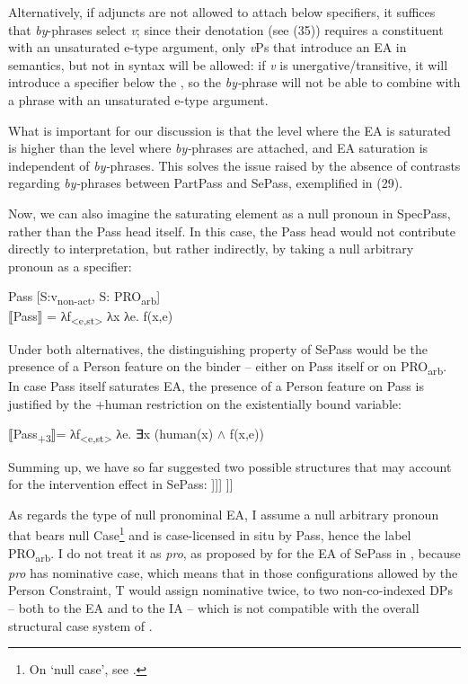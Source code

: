 \documentclass[output=paper]{langsci/langscibook}
\begin{document}
Alternatively, if adjuncts are not allowed to attach below specifiers, it suffices that \textit{by}{}-phrases select \textit{v}; since their denotation (see (35)) requires a constituent with an unsaturated e-type argument, only \textit{v}Ps that introduce an EA in semantics, but not in syntax will be allowed: if \textit{v} is unergative\slash transitive, it will introduce a specifier below the , so the \textit{by-}phrase will not be able to combine with a phrase with an unsaturated e-type argument.

What is important for our discussion is that the level where the EA is saturated is higher than the level where \textit{by-}phrases are attached, and EA saturation is independent of \textit{by-}phrases. This solves the issue raised by the absence of contrasts regarding \textit{by-}phrases between PartPass and SePass, exemplified in (29). 

Now, we can also imagine the saturating element as a null pronoun in SpecPass, rather than the Pass head itself. In this case, the Pass head would not contribute directly to interpretation, but rather indirectly, by taking a null arbitrary pronoun as a specifier:

\ea%
    Pass [S:v\textsubscript{non-act}, S: PRO\textsubscript{arb}]\label{ex:giurgea:38}\\
  ⟦Pass⟧ = λf\textsubscript{<e,st>} λx λe. f(x,e)
\z
 
Under both alternatives, the distinguishing property of SePass would be the presence of a Person feature on the binder – either on Pass itself or on PRO\textsubscript{arb}. In case Pass itself saturates EA, the presence of a Person feature on Pass is justified by the +human restriction on the existentially bound variable:

\ea%
    \label{ex:giurgea:39}
⟦Pass\textsubscript{+3}⟧= λf\textsubscript{<e,st>} λe. ∃x (human(x) $\wedge$ f(x,e))
\z

Summing up, we have so far suggested two possible structures that may account for the intervention effect in SePass:
% 
\ea%
    \label{ex:giurgea:40}
    \ea\relax [\textsubscript{PassP} PRO\textsubscript{arb}\textsubscript{+Person} [Pass [\textit{\textsubscript{v}}\textsubscript{P} \textit{v} [\textsubscript{VP} V IA]]]]
    \ex\relax [\textsubscript{PassP} Pass\textsubscript{+Person} [\textit{\textsubscript{v}}\textsubscript{P} \textit{v} [\textsubscript{VP} V IA]]]
    \z
\z 

As regards the type of null pronominal EA, I assume a null arbitrary pronoun that bears null Case\footnote{On ‘null case', see \citet{Chomsky1993,Bošković1995,Bošković1997,Martin2001}.}  and is case-licensed in situ by Pass, hence the label PRO\textsubscript{arb}. I do not treat it as \textit{pro}, as proposed by \citet{MacDonald2017} for the EA of SePass in , because \textit{pro} has nominative case, which means that in those configurations allowed by the Person Constraint, T would assign nominative twice, to two non-co-indexed DPs – both to the EA and to the IA – which is not compatible with the overall structural case system of .
\end{document}
